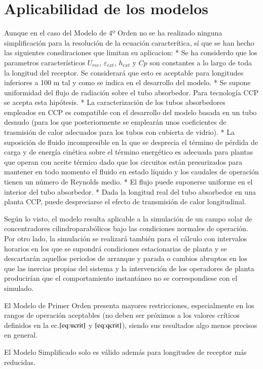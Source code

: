 \section{Aplicabilidad de los modelos}
Aunque en el caso del Modelo de 4º Orden no se ha realizado ninguna simplificación para la resolución de la ecuación caracterítica, sí que se han hecho las siguientes consdiraciones que limitan su aplicacion: 
* Se ha considerdo que los parametros característicos \(U_{rec}\), \(\varepsilon_{ext}\), \(h_{ext}\) y \(Cp\) son constantes a lo largo de toda la longitud del receptor. Se considerará que esto es aceptable para longitudes inferiores a 100 m tal y como se indica en el desarrollo del modelo. 
* Se supone uniformidad del flujo de radiación sobre el tubo absorbedor. Para tecnología CCP se acepta esta hipótesis. 
* La caracterización de los tubos absorbedores empleados en CCP es compatible con el desarrollo del modelo basada en un tubo desnudo (para los que posteriormente se emplearán unos coeficientes de trasmisión de calor adecuados para los tubos con cubierta de vidrio). 
* La suposición de fluido incompresible en la que se desprecia el término de pérdida de carga y de energía cinética sobre el término energético es adecuada para plantas que operan con aceite térmico dado que los circuitos están presurizados para mantener en todo momento el fluido en estado líquido y los caudales de operación tienen un número de Reynolds medio. 
* El flujo puede suponerse uniforme en el interior del tubo absorbedor. 
* Dada la longitud real del tubo absorbedor en una planta CCP, puede despreciarse el efecto de transmisión de calor longitudinal. 

Según lo visto, el modelo resulta aplicable a la simulación de un campo solar de concentradores cilindroparabólicos bajo las condiciones normales de operación. Por otro lado, la simulación se realizará también para el cálculo con intervalos horarios en los que se supondrá condiciones estacionarias de planta y se descartarán aquellos periodos de arranque y parada o cambios abruptos en los que las inercias propias del sistema y la intervención de los operadores de planta producirían que el comportamiento instantáneo no se correspondiese con el simulado.

El Modelo de Primer Orden presenta mayores restricciones, especialmente en los rangos de operación aceptables (no deben ser próximos a los valores críticos definidos en la ec.\(\eqref{eq:ucrit}\) y \(\eqref{eq:qcrit}\)), siendo sus resultados algo menos precisos en general.

El Modelo Simplificado solo es válido además para longitudes de receptor más reducidas.
